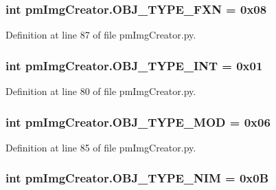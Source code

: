 \hypertarget{namespacepm_img_creator_af77f8422ea2a40d75f181118d0ad0dc7}{
\subsubsection[{O\-B\-J\-\_\-\-T\-Y\-P\-E\-\_\-\-F\-X\-N}]{\setlength{\rightskip}{0pt plus 5cm}int pm\-Img\-Creator.\-O\-B\-J\-\_\-\-T\-Y\-P\-E\-\_\-\-F\-X\-N = 0x08}}\label{namespacepm_img_creator_af77f8422ea2a40d75f181118d0ad0dc7}


Definition at line 87 of file pm\-Img\-Creator.\-py.

\hypertarget{namespacepm_img_creator_a5850308dea98e59546222e2a3e84c390}{
\subsubsection[{O\-B\-J\-\_\-\-T\-Y\-P\-E\-\_\-\-I\-N\-T}]{\setlength{\rightskip}{0pt plus 5cm}int pm\-Img\-Creator.\-O\-B\-J\-\_\-\-T\-Y\-P\-E\-\_\-\-I\-N\-T = 0x01}}\label{namespacepm_img_creator_a5850308dea98e59546222e2a3e84c390}


Definition at line 80 of file pm\-Img\-Creator.\-py.

\hypertarget{namespacepm_img_creator_a31466f4a20e0785147058b990814289a}{
\subsubsection[{O\-B\-J\-\_\-\-T\-Y\-P\-E\-\_\-\-M\-O\-D}]{\setlength{\rightskip}{0pt plus 5cm}int pm\-Img\-Creator.\-O\-B\-J\-\_\-\-T\-Y\-P\-E\-\_\-\-M\-O\-D = 0x06}}\label{namespacepm_img_creator_a31466f4a20e0785147058b990814289a}


Definition at line 85 of file pm\-Img\-Creator.\-py.

\hypertarget{namespacepm_img_creator_a6d51285dfe54c2e915be868a4d64a0d3}{
\subsubsection[{O\-B\-J\-\_\-\-T\-Y\-P\-E\-\_\-\-N\-I\-M}]{\setlength{\rightskip}{0pt plus 5cm}int pm\-Img\-Creator.\-O\-B\-J\-\_\-\-T\-Y\-P\-E\-\_\-\-N\-I\-M = 0x0\-B}}\label{namespacepm_img_creator_a6d51285dfe54c2e915be868a4d64a0d3}


